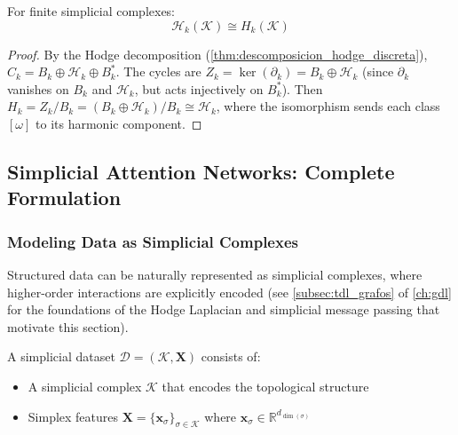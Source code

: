 \begin{theorem}\label{thm:isomorfismo_harmonico_homologia}
For finite simplicial complexes:
\begin{equation}
    \mathcal{H}_k(\mathcal{K}) \cong H_k(\mathcal{K})
\end{equation}
\end{theorem}

\begin{proof}
By the Hodge decomposition (\autoref{thm:descomposicion_hodge_discreta}), $C_k = B_k \oplus \mathcal{H}_k \oplus B_k^*$. The cycles are $Z_k = \ker(\partial_k) = B_k \oplus \mathcal{H}_k$ (since $\partial_k$ vanishes on $B_k$ and $\mathcal{H}_k$, but acts injectively on $B_k^*$). Then $H_k = Z_k / B_k = (B_k \oplus \mathcal{H}_k) / B_k \cong \mathcal{H}_k$, where the isomorphism sends each class $[\omega]$ to its harmonic component.
\end{proof}

\subsection{Simplicial Attention Networks: Complete Formulation}

\subsubsection{Modeling Data as Simplicial Complexes}

Structured data can be naturally represented as simplicial complexes, where higher-order interactions are explicitly encoded (see \autoref{subsec:tdl_grafos} of \autoref{ch:gdl} for the foundations of the Hodge Laplacian and simplicial message passing that motivate this section).

\begin{definition}\label{def:dataset_simplicial}
A simplicial dataset $\mathcal{D} = (\mathcal{K}, \mathbf{X})$ consists of:
\begin{itemize}
    \item A simplicial complex $\mathcal{K}$ that encodes the topological structure
    \item Simplex features $\mathbf{X} = \{\mathbf{x}_{\sigma}\}_{\sigma \in \mathcal{K}}$ where $\mathbf{x}_{\sigma} \in \mathbb{R}^{d_{\dim(\sigma)}}$
\end{itemize}
\end{definition}

